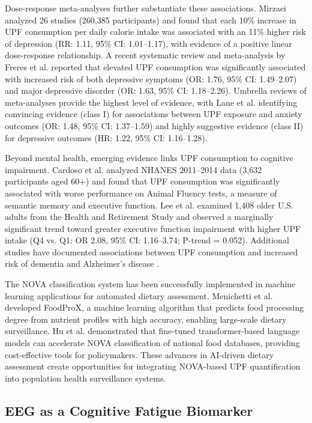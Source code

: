 \documentclass[journal,twoside,10pt]{IEEEtran}
\begin{document}
Dose-response meta-analyses further substantiate these associations. Mirzaei \cite{ref27} analyzed 26 studies (260,385 participants) and found that each 10\% increase in UPF consumption per daily calorie intake was associated with an 11\% higher risk of depression (RR: 1.11, 95\% CI: 1.01--1.17), with evidence of a positive linear dose-response relationship. A recent systematic review and meta-analysis by Freres et al. \cite{ref35} reported that elevated UPF consumption was significantly associated with increased risk of both depressive symptoms (OR: 1.76, 95\% CI: 1.49--2.07) and major depressive disorder (OR: 1.63, 95\% CI: 1.18--2.26). Umbrella reviews of meta-analyses provide the highest level of evidence, with Lane et al. \cite{ref29} identifying convincing evidence (class I) for associations between UPF exposure and anxiety outcomes (OR: 1.48, 95\% CI: 1.37--1.59) and highly suggestive evidence (class II) for depressive outcomes (HR: 1.22, 95\% CI: 1.16--1.28).

Beyond mental health, emerging evidence links UPF consumption to cognitive impairment. Cardoso et al. \cite{ref18} analyzed NHANES 2011--2014 data (3,632 participants aged 60+) and found that UPF consumption was significantly associated with worse performance on Animal Fluency tests, a measure of semantic memory and executive function. Lee et al. \cite{ref22} examined 1,408 older U.S. adults from the Health and Retirement Study and observed a marginally significant trend toward greater executive function impairment with higher UPF intake (Q4 vs. Q1: OR 2.08, 95\% CI: 1.16--3.74; P-trend = 0.052). Additional studies have documented associations between UPF consumption and increased risk of dementia and Alzheimer's disease \cite{ref1,ref36,ref38,ref40}.

The NOVA classification system has been successfully implemented in machine learning applications for automated dietary assessment. Menichetti et al. \cite{ref48} developed FoodProX, a machine learning algorithm that predicts food processing degree from nutrient profiles with high accuracy, enabling large-scale dietary surveillance. Hu et al. \cite{ref6} demonstrated that fine-tuned transformer-based language models can accelerate NOVA classification of national food databases, providing cost-effective tools for policymakers. These advances in AI-driven dietary assessment create opportunities for integrating NOVA-based UPF quantification into population health surveillance systems.

\subsection{EEG as a Cognitive Fatigue Biomarker}
\end{document}
